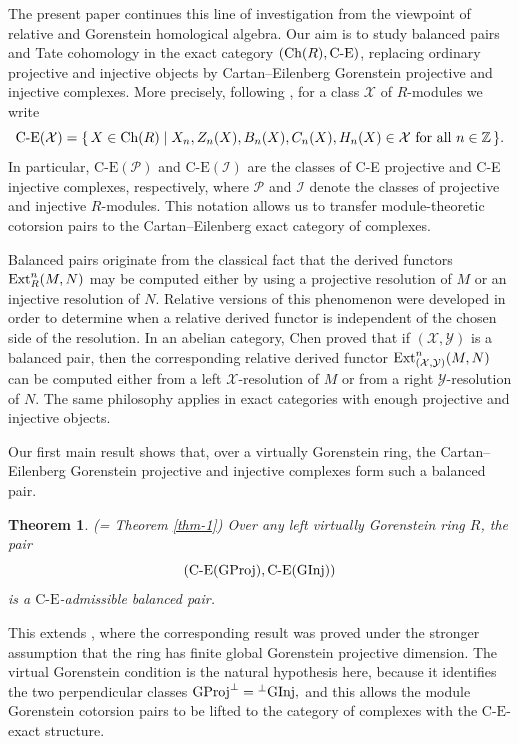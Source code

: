 \documentclass[reqno,12pt]{amsart}
\numberwithin{equation}{section}
\def\Ext{\mbox{\rm Ext}} \def\Tor{\mbox{\rm Tor}}\def\Hom{\mbox{\rm Hom}} \def\dim{\mbox{\rm dim}} \def\Iso{\mbox{\rm Iso}}
\def\dim{\mbox{\rm dim}}\def\Irr{\mbox{\rm Irr}}\def\rad{\mbox{\rm rad}}\def\fg{\mbox{\rm fg}}
\def\Ch{\mbox{\rm Ch}}
\theoremstyle{plain}
\newtheorem{theorem}{\bf Theorem}[section]
\theoremstyle{definition}
\newcommand{\CE}{\mathrm{C}\text{-}\mathrm{E}}
\begin{document}
The present paper continues this line of investigation from the viewpoint of
relative and Gorenstein homological algebra. Our aim is to study balanced pairs
and Tate cohomology in the exact category $(\Ch(R),\text{\rm C-E})$, replacing
ordinary projective and injective objects by Cartan--Eilenberg Gorenstein
projective and injective complexes. More precisely, following \cite[Definition 3.1]{E11}, for a class $\mathcal X$
of $R$-modules we write $$
\text{\rm C-E}(\mathcal X)
=
\{\,X\in \Ch(R)
   \mid X_n,Z_n(X),B_n(X),C_n(X),H_n(X)\in \mathcal X
      \text{ for all } n\in \mathbb Z\,\}.$$
In particular, $\CE(\mathcal P)$ and
$\CE(\mathcal I)$ are the classes of C-E projective and C-E
injective complexes, respectively, where $\mathcal P$ and $\mathcal I$
denote the classes of projective and injective $R$-modules. This notation
allows us to transfer module-theoretic cotorsion pairs to the
Cartan--Eilenberg exact category of complexes.

Balanced pairs originate from the classical fact that the derived functors
$\Ext^n_R(M,N)$ may be computed either by using a projective resolution of
$M$ or an injective resolution of $N$. Relative versions of this phenomenon
were developed in order to determine when a relative derived functor is
independent of the chosen side of the resolution. In an abelian category, Chen \cite{C10}
proved that if $(\mathcal X,\mathcal Y)$ is a balanced pair, then the
corresponding relative derived functor $
\Ext^n_{(\mathcal X,\mathcal Y)}(M,N)$
can be computed either from a left $\mathcal X$-resolution of $M$ or from a
right $\mathcal Y$-resolution of $N$. The same philosophy applies
in exact categories with enough projective and injective objects.

Our first main result shows that, over a virtually Gorenstein ring, the
Cartan--Eilenberg Gorenstein projective and injective complexes form such a
balanced pair.

 \begin{theorem}
        (= Theorem \ref{thm-1}) Over any left virtually Gorenstein ring $R$, the pair
    $$(\CE({\rm GProj}),\CE({\rm GInj}))$$ is a $\CE$-admissible balanced pair.
    \end{theorem}

 This extends \cite[Theorem 2.22]{YL14}, where the corresponding result was
proved under the stronger assumption that the ring has finite global Gorenstein
projective dimension. The virtual Gorenstein condition is the natural hypothesis
here, because it identifies the two perpendicular classes  ${\rm GProj}^{\perp}={}^{\perp}{\rm GInj},$
and this allows the module Gorenstein cotorsion pairs to be lifted
to the category of complexes with the $\CE$-exact structure.
\end{document}
